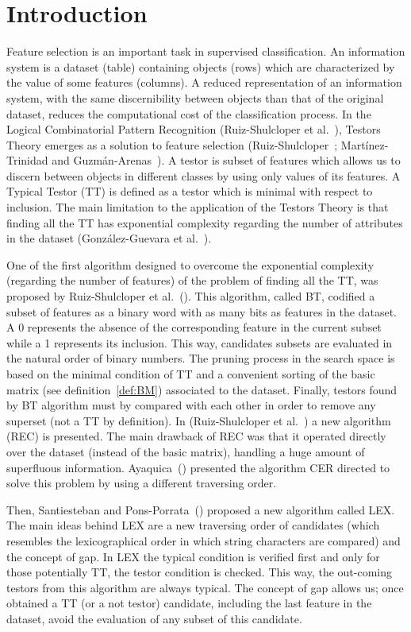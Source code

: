 \documentclass[citeauthoryear]{llncs}
\begin{document}
\section{Introduction}
%
	Feature selection is an important task in supervised classification. An information system is a dataset (table) containing objects (rows) which are	characterized by the value of some features (columns). A reduced representation of an information system, with the same discernibility between objects than that of the original dataset, reduces the computational	cost of the classification process. In the Logical Combinatorial Pattern Recognition (Ruiz-Shulcloper et al.~\cite{Shulcloper1995}), Testors Theory emerges as a solution to feature selection (Ruiz-Shulcloper~\cite{Shulcloper2008};	Mart\'inez-Trinidad and	Guzm\'an-Arenas~\cite{Martinez2001}). A testor is subset of features which allows us to discern between objects in different classes by using only values of its features. A Typical Testor (TT) is defined as a testor which is minimal with respect to inclusion. The main limitation to the application of the Testors Theory is that finding all the TT has exponential complexity regarding the number of attributes in the dataset (González-Guevara et al.~\cite{Gonzalez15}).
	
	One of the first algorithm designed to overcome the exponential complexity (regarding the number of features) of the problem of finding all the TT, was proposed by Ruiz-Shulcloper et al.~(\cite{Shulcloper1985}). This algorithm, called BT, codified a subset of features as a binary word with as many bits as features in the dataset. A 0 represents the absence of the corresponding feature in the current	subset while a 1 represents its inclusion. This way, candidates subsets are evaluated in the natural order of binary numbers. The pruning process in the	search space is based on the minimal condition of TT and a convenient sorting of the basic matrix (see definition~\ref{def:BM}) associated to the dataset. Finally, testors found by BT algorithm must by compared with each other in order to remove	any superset (not a TT by definition). In (Ruiz-Shulcloper et al.~\cite{Shulcloper1995b}) a new algorithm (REC) is presented.	The main drawback of REC was that it operated directly over the dataset (instead of the	basic matrix), handling a huge amount of superfluous information. Ayaquica~(\cite{Ayaquica1997})	presented the algorithm CER directed to solve this problem by using a different traversing	order. 
	
	Then, Santiesteban and Pons-Porrata~(\cite{Santiesteban2003}) proposed a new algorithm called LEX. The main ideas behind LEX are a new traversing order of candidates (which resembles the	lexicographical order in which string characters are compared) and the concept of gap. In LEX the typical condition is verified first and only for those potentially TT, the testor condition is checked. This way, the out-coming testors from this algorithm are always typical. The concept of gap allows us; once obtained a TT (or a not testor) candidate, including the last feature in the dataset, avoid the evaluation of any subset of this candidate.
	
\end{document}
